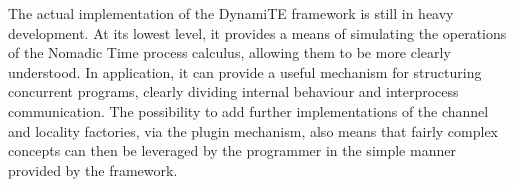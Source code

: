 The actual implementation of the DynamiTE framework is still in heavy
development.  At its lowest level, it provides a means of simulating
the operations of the Nomadic Time process calculus, allowing them to
be more clearly understood.  In application, it can provide a useful
mechanism for structuring concurrent programs, clearly dividing
internal behaviour and interprocess communication.  The possibility to
add further implementations of the channel and locality factories, via
the plugin mechanism, also means that fairly complex concepts can then
be leveraged by the programmer in the simple manner provided by the
framework.
